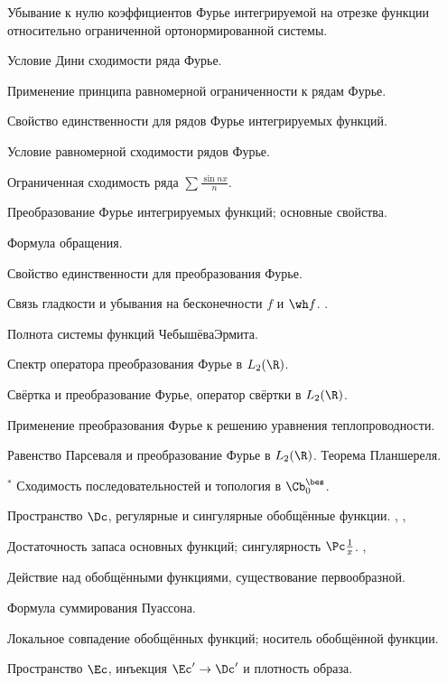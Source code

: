 \documentclass[a4paper]{article}
\begin{document}
\begin{nums}{-3}
\item Убывание к нулю коэффициентов Фурье интегрируемой на отрезке функции относительно
ограниченной ортонормированной системы.
\item Условие Дини сходимости ряда Фурье. \cite[8.1]{kf}
\item Применение принципа равномерной ограниченности к рядам Фурье. \cite[8.1]{kf}
\item Свойство единственности для рядов Фурье интегрируемых функций. \cite[7.1]{sh}
\item Условие равномерной сходимости рядов Фурье. \cite[8.1]{kf}
\item Ограниченная сходимость ряда $\sum\frac{\sin nx}{n}$. \cite[3.7]{hr}
\item Преобразование Фурье интегрируемых функций; основные свойства. \cite[8.4]{kf}
\item Формула обращения. \cite[8.4]{kf}
\item Свойство единственности для преобразования Фурье. \cite[8.4]{kf}
\item Связь гладкости и убывания на бесконечности $f$ и $\wh f$. \cite[8.4]{kf}.
\item Полнота системы функций Чебышёва\ч Эрмита. \cite[8.4]{kf}
\item Спектр оператора преобразования Фурье в $L_2(\R)$.
\item Свёртка и преобразование Фурье, оператор свёртки в $L_2(\R)$.
\item Применение преобразования Фурье к решению уравнения теплопроводности. \cite[8.4]{kf}
\item Равенство Парсеваля и преобразование Фурье в $L_2(\R)$. Теорема Планшереля. \cite[8.5]{kf}
\item $^*$ Сходимость последовательностей и топология в $\Cb_0^\bes$.
\item Пространство $\Dc$, регулярные и сингулярные обобщённые функции. \cite{vl}, \cite{gs}, \cite{ru}
\item Достаточность запаса основных функций; сингулярность $\Pc\frac{1}{x}$. \cite{lec}, \cite{vl}
\item Действие над обобщёнными функциями, существование первообразной. \cite[1.2]{gs}
\item Формула суммирования Пуассона. \cite[1.2]{gs}
\item Локальное совпадение обобщённых функций; носитель обобщённой функции. \cite[6]{ru}
\item Пространство $\Ec$, инъекция $\Ec'\to \Dc'$ и плотность образа. \cite{lec}

\end{nums}
\end{document}
